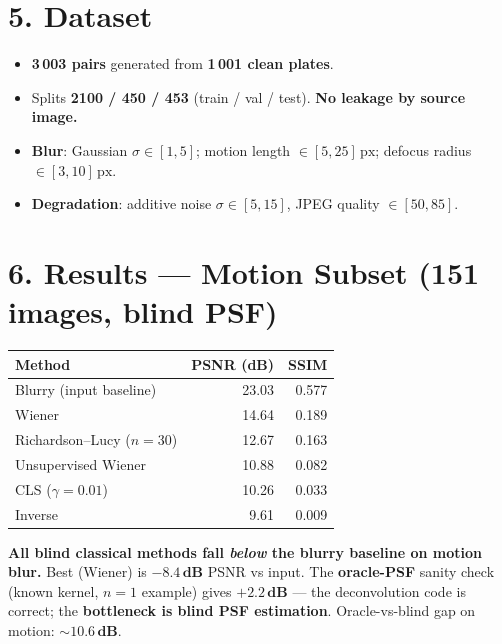 \documentclass[10pt,a4paper]{article}
\begin{document}
\section*{5. Dataset}
\begin{itemize}
  \item \textbf{3\,003 pairs} generated from \textbf{1\,001 clean plates}.
  \item Splits \textbf{2100 / 450 / 453} (train / val / test). \textbf{No leakage by source image.}
  \item \textbf{Blur}: Gaussian $\sigma \in [1,5]$; motion length $\in [5,25]\,\text{px}$; defocus radius $\in [3,10]\,\text{px}$.
  \item \textbf{Degradation}: additive noise $\sigma \in [5,15]$, JPEG quality $\in [50,85]$.
\end{itemize}

\newpage
\section*{6. Results --- Motion Subset (151 images, blind PSF)}
\begin{center}
\begin{tabular}{lrr}
\toprule
\textbf{Method} & \textbf{PSNR (dB)} & \textbf{SSIM} \\
\midrule
Blurry (input baseline)        & 23.03 & 0.577 \\
Wiener                         & 14.64 & 0.189 \\
Richardson--Lucy ($n{=}30$)    & 12.67 & 0.163 \\
Unsupervised Wiener            & 10.88 & 0.082 \\
CLS ($\gamma{=}0.01$)          & 10.26 & 0.033 \\
Inverse                        &  9.61 & 0.009 \\
\bottomrule
\end{tabular}
\end{center}

\begin{tcolorbox}[colback=red!5,colframe=red!60!black,boxrule=0.4pt,title=\textbf{Headline (say this first)}]
\textbf{All blind classical methods fall \emph{below} the blurry baseline on motion blur.}
Best (Wiener) is $\mathbf{-8.4\,\text{dB}}$ PSNR vs input. The \textbf{oracle-PSF}
sanity check (known kernel, $n{=}1$ example) gives $\mathbf{+2.2\,\text{dB}}$ ---
the deconvolution code is correct; the \textbf{bottleneck is blind PSF estimation}.
Oracle-vs-blind gap on motion: $\sim \mathbf{10.6\,\text{dB}}$.
\end{tcolorbox}
\end{document}
